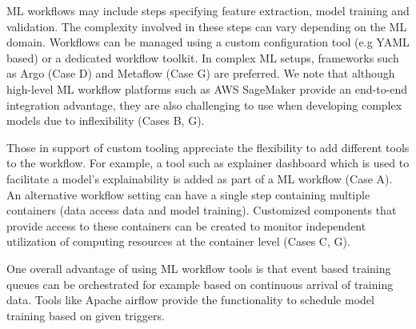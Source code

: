 ML workflows may include steps specifying feature extraction, model training and validation. The complexity involved in these steps can vary depending on the ML domain. Workflows can be managed using a custom configuration tool (e.g YAML based) or a dedicated workflow toolkit. In complex ML setups, frameworks such as Argo (Case D) and Metaflow (Case G) are preferred. We note that although high-level ML workflow platforms such as AWS SageMaker provide an end-to-end integration advantage, they are also challenging to use when developing complex models due to inflexibility (Cases B, G).


Those in support of custom tooling appreciate the flexibility to add different tools to the workflow. For example, a tool such as explainer dashboard which is used to facilitate a model's explainability is added as part of a ML workflow (Case A). An alternative workflow setting can have a single step containing multiple containers (data access data and model training). Customized components that provide access to these containers can be created to monitor independent utilization of computing resources at the container level (Cases C, G).

One overall advantage of using ML workflow tools is that event based training queues can be orchestrated for example based on continuous arrival of training data.  Tools like Apache airflow provide the functionality to schedule model training based on given triggers. %


